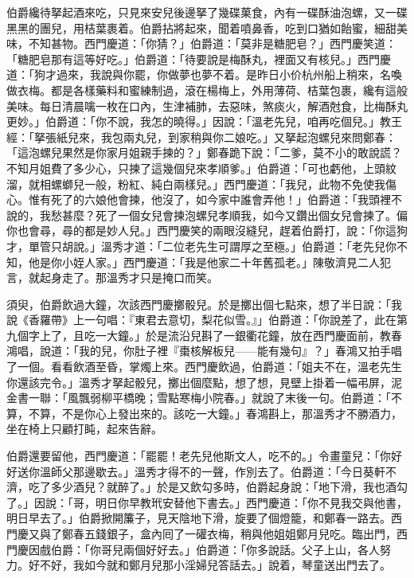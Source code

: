 伯爵纔待拏起酒來吃，只見來安兒後邊拏了幾碟菓食，內有一碟酥油泡螺，又一碟黑黑的團兒，用桔葉裹着。伯爵拈將起來，聞着噴鼻香，吃到口猶如飴蜜，細甜美味，不知甚物。西門慶道：「你猜？」伯爵道：「莫非是糖肥皂？」西門慶笑道：「糖肥皂那有這等好吃。」伯爵道：「待要說是梅酥丸，裡面又有核兒。」西門慶道：「狗才過來，我說與你罷，你做夢也夢不着。是昨日小价杭州船上稍來，名喚做衣梅。都是各樣藥料和蜜練制過，滾在楊梅上，外用薄荷、桔葉包裹，纔有這般美味。每日清晨噙一枚在口內，生津補肺，去惡味，煞痰火，解酒尅食，比梅酥丸更妙。」伯爵道：「你不說，我怎的曉得。」因說：「溫老先兒，咱再吃個兒。」教王經：「拏張紙兒來，我包兩丸兒，到家稍與你二娘吃。」又拏起泡螺兒來問鄭春：「這泡螺兒果然是你家月姐親手揀的？」鄭春跪下說：「二爹，莫不小的敢說謊？不知月姐費了多少心，只揀了這幾個兒來孝順爹。」伯爵道：「可也虧他，上頭紋溜，就相螺螄兒一般，粉紅、純白兩樣兒。」西門慶道：「我兒，此物不免使我傷心。惟有死了的六娘他會揀，他沒了，如今家中誰會弄他！」伯爵道：「我頭裡不說的，我愁甚麼？死了一個女兒會揀泡螺兒孝順我，如今又鑽出個女兒會揀了。偏你也會尋，尋的都是妙人兒。」{}西門慶笑的兩眼沒縫兒，趕着伯爵打，說：「你這狗才，單管只胡說。」溫秀才道：「二位老先生可謂厚之至極。」{}伯爵道：「老先兒你不知，他是你小姪人家。」西門慶道：「我是他家二十年舊孤老。」陳敬濟見二人犯言，就起身走了。那溫秀才只是掩口而笑。{}

須臾，伯爵飲過大鐘，次該西門慶擲骰兒。於是擲出個七點來，想了半日說：「我說《香羅帶》上一句唱：『東君去意切，梨花似雪。』」伯爵道：「你說差了，此在第九個字上了，且吃一大鐘。」於是流沿兒斟了一銀衢花鐘，放在西門慶面前，教春鴻唱，說道：「我的兒，你肚子裡『棗核解板兒——能有幾句』？」春鴻又拍手唱了一個。看看飲酒至昏，掌燭上來。西門慶飲過，伯爵道：「姐夫不在，溫老先生你還該完令。」溫秀才拏起骰兒，擲出個麼點，想了想，見壁上掛着一幅弔屏，泥金書一聯：「風飄弱柳平橋晚；雪點寒梅小院春。」就說了末後一句。伯爵道：「不算，不算，不是你心上發出來的。該吃一大鐘。」春鴻斟上，那溫秀才不勝酒力，坐在椅上只顧打盹，起來告辭。

伯爵還要留他，西門慶道：「罷罷！老先兒他斯文人，吃不的。」令畫童兒：「你好好送你溫師父那邊歇去。」溫秀才得不的一聲，作別去了。伯爵道：「今日葵軒不濟，吃了多少酒兒？就醉了。」於是又飲勾多時，伯爵起身說：「地下滑，我也酒勾了。」因說：「哥，明日你早教玳安替他下書去。」西門慶道：「你不見我交與他書，明日早去了。」伯爵掀開簾子，見天陰地下滑，旋要了個燈籠，和鄭春一路去。西門慶又與了鄭春五錢銀子，盒內囘了一礶衣梅，稍與他姐姐鄭月兒吃。臨出門，西門慶因戲伯爵：「你哥兒兩個好好去。」{}伯爵道：「你多說話。父子上山，各人努力。好不好，我如今就和鄭月兒那小淫婦兒答話去。」說着，琴童送出門去了。

